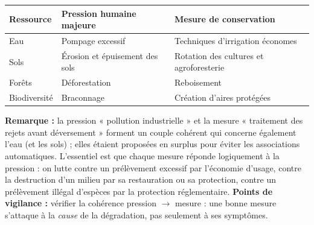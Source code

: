 \documentclass[11pt]{article}
\begin{document}
\begin{corrige}
\begin{center}
\begin{tabularx}{\linewidth}{|l|X|X|}\hline
\rowcolor{popblueL} \textbf{Ressource} & \textbf{Pression humaine majeure} & \textbf{Mesure de conservation} \\ \hline
Eau & Pompage excessif & Techniques d'irrigation économes \\ \hline
Sols & Érosion et épuisement des sols & Rotation des cultures et agroforesterie \\ \hline
Forêts & Déforestation & Reboisement \\ \hline
Biodiversité & Braconnage & Création d'aires protégées \\ \hline
\end{tabularx}
\end{center}
\textbf{Remarque :} la pression « pollution industrielle » et la mesure « traitement des rejets avant déversement » forment un couple cohérent qui concerne également l'eau (et les sols) ; elles étaient proposées en surplus pour éviter les associations automatiques. L'essentiel est que chaque mesure réponde logiquement à la pression : on lutte contre un prélèvement excessif par l'économie d'usage, contre la destruction d'un milieu par sa restauration ou sa protection, contre un prélèvement illégal d'espèces par la protection réglementaire.
\textbf{Points de vigilance :} vérifier la cohérence pression $\rightarrow$ mesure : une bonne mesure s'attaque à la \emph{cause} de la dégradation, pas seulement à ses symptômes.
\end{corrige}
\end{document}
